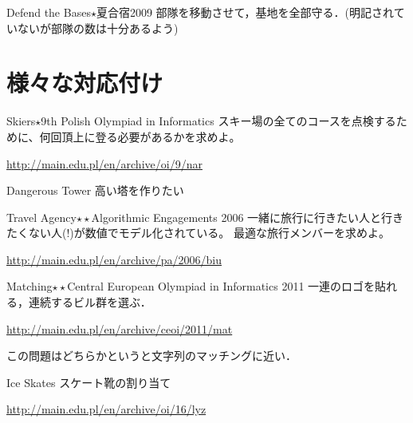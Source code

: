 \begin{versionalpha}
\begin{pbox}{Defend the Bases$\star$}{夏合宿2009}
部隊を移動させて，基地を全部守る．(明記されていないが部隊の数は十分あるよう)
  
\end{pbox}

\section{様々な対応付け}

\begin{pbox}{Skiers$\star$}{9th Polish Olympiad in Informatics}
スキー場の全てのコースを点検するために、何回頂上に登る必要があるかを求めよ。

\url{http://main.edu.pl/en/archive/oi/9/nar} 
\end{pbox}

\begin{pbox}{Dangerous Tower}
高い塔を作りたい

  \end{pbox}


\begin{pbox}{Travel Agency$\star\star$}{Algorithmic Engagements 2006}
一緒に旅行に行きたい人と行きたくない人(!)が数値でモデル化されている。
最適な旅行メンバーを求めよ。

\url{http://main.edu.pl/en/archive/pa/2006/biu}
\end{pbox}

\begin{pbox}{Matching$\star\star$}{Central European Olympiad in Informatics 2011}
一連のロゴを貼れる，連続するビル群を選ぶ．

\url{http://main.edu.pl/en/archive/ceoi/2011/mat}
\end{pbox}

この問題はどちらかというと文字列のマッチングに近い．

\begin{pbox}{Ice Skates}{}
スケート靴の割り当て
  
\url{http://main.edu.pl/en/archive/oi/16/lyz}
\end{pbox}
\end{versionalpha}
